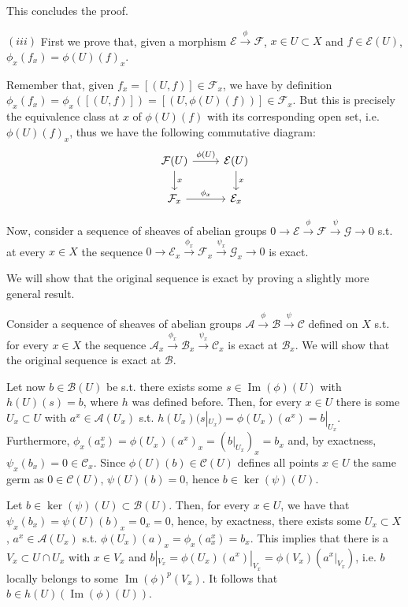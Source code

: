 \documentclass{article}
\DeclareMathOperator{\Ima}{Im}
\begin{document}
This concludes the proof.

$(iii)$ First we prove that, given a morphism $\mathcal{E}\xrightarrow{\phi}\mathcal{F}$, $x\in U\subset X$ and $f\in\mathcal{E}(U)$, $\phi_x(f_x)=\phi(U)(f)_x$.

Remember that, given $f_x=[(U,f)]\in\mathcal{F}_x$, we have by definition $\phi_x(f_x)=\phi_x([(U,f)])=[(U,\phi(U)(f))]\in\mathcal{F}_x$. But this is precisely the equivalence class at $x$ of $\phi(U)(f)$ with its corresponding open set, i.e. $\phi(U)(f)_x$, thus we have the following commutative diagram:
\[
  \begin{tikzcd}
    \mathcal{F}(U) \arrow{r}{\phi(U)} \arrow{d}{x}
    & \mathcal{E}(U) \arrow{d}{x} \\
    \mathcal{F}_x \arrow{r}{\phi_x}
    & \mathcal{E}_x
  \end{tikzcd}
\]

Now, consider a sequence of sheaves of abelian groups $0\rightarrow\mathcal{E}\xrightarrow{\phi}\mathcal{F}\xrightarrow{\psi}\mathcal{G}\rightarrow 0$ s.t. at every $x\in X$ the sequence $0\rightarrow\mathcal{E}_x\xrightarrow{\phi_x}\mathcal{F}_x\xrightarrow{\psi_x}\mathcal{G}_x\rightarrow 0$ is exact.

We will show that the original sequence is exact by proving a slightly more general result.

Consider a sequence of sheaves of abelian groups $\mathcal{A}\xrightarrow{\phi}\mathcal{B}\xrightarrow{\psi}\mathcal{C}$ defined on $X$ s.t. for every $x\in X$ the sequence $\mathcal{A}_x\xrightarrow{\phi_x}\mathcal{B}_x\xrightarrow{\psi_x}\mathcal{C}_x$ is exact at $\mathcal{B}_x$. We will show that the original sequence is exact at $\mathcal{B}$.

Let now $b\in\mathcal{B}(U)$ be s.t. there exists some $s\in\Ima(\phi)(U)$ with $h(U)(s)=b$, where $h$ was defined before. Then, for every $x\in U$ there is some $U_x\subset U$ with $a^x\in\mathcal{A}(U_x)$ s.t. $h(U_x)(s|_{U_x})=\phi(U_x)(a^x)=b|_{U_x}$. Furthermore, $\phi_x(a^x_x)=\phi(U_x)(a^x)_x=(b|_{U_x})_x=b_x$ and, by exactness, $\psi_x(b_x)=0\in\mathcal{C}_x$. Since $\phi(U)(b)\in\mathcal{C}(U)$ defines all points $x\in U$ the same germ as $0\in\mathcal{C}(U)$, $\psi(U)(b)=0$, hence $b\in\ker(\psi)(U)$.

Let $b\in\ker(\psi)(U)\subset\mathcal{B}(U)$. Then, for every $x\in U$, we have that $\psi_x(b_x)=\psi(U)(b)_x=0_x=0$, hence, by exactness, there exists some $U_x\subset X$, $a^x\in\mathcal{A}(U_x)$ s.t. $\phi(U_x)(a)_x=\phi_x(a^x_x)=b_x$. This implies that there is a $V_x\subset U\cap U_x$ with $x\in V_x$ and $b|_{V_x}=\phi(U_x)(a^x)|_{V_x}=\phi(V_x)(a^x|_{V_x})$, i.e. $b$ locally belongs to some $\Ima(\phi)^p(V_x)$. It follows that $b\in h(U)(\Ima(\phi)(U))$.
\end{document}
